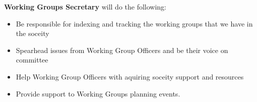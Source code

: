 \begin{subclause}
	\textbf{Working Groups Secretary} will do the following:
	\begin{itemize}[label=--,topsep=0em,itemsep=0em]
		\item Be responsible for indexing and tracking the working groups that we have in the soceity
		\item Spearhead issues from Working Group Officers and be their voice on committee
        \item Help Working Group Officers with aquiring soceity support and resources
        \item Provide support to Working Groups planning events.
	\end{itemize}
\end{subclause}
